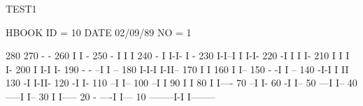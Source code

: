\begin{Fighere}
\begin{minipage}[t]{.525\textwidth}
\begin{XMPfrac}{3.2}
TEST1
 
HBOOK     ID =        10                                        DATE  02/09/89                          NO =  1
 
     280
     270                                                      - -
     260                                                      I I  -
     250                                                   -  I I  I
     240                                                 - I  I-I- I -
     230                                                 I-I--I  I I-I-
     220                                                -I       I I  I-
     210                                                I        I I   I-
     200                                                I        I-I    I-
     190                                          - - --I                I --
     180                                          I-I-I                  I-II--
     170                                          I                           I
     160                                          I                           I--
     150                                       - -I                             I --
     140                                      -I-I                              I II
     130                                     -I                                 I-II-
     120                                    -I                                      I-
     110                                  --I                                        I--
     100                                --I                                            I
      90                                I                                              I
      80                                I                                              I----
      70                              --I                                                  I-
      60                             -I                                                     I--
      50                          ---I                                                        I--
      40                     -----I                                                             I--
      30                     I                                                                    I-----
      20               - ----I                                                                         I---
      10       --------I-I                                                                                I--------
 

\end{XMPfrac}
\end{minipage}
\end{Fighere}
